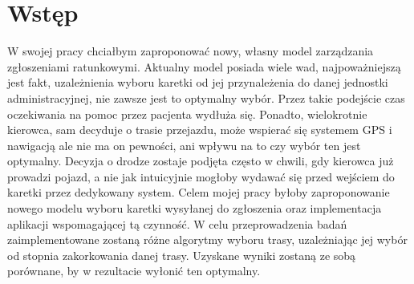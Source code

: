 \documentclass[12pt]{article} %
\begin{document}

\tableofcontents %

\newpage %


\section{Wstęp}
W swojej pracy chciałbym zaproponować nowy, własny model zarządzania zgłoszeniami ratunkowymi. Aktualny model posiada wiele wad, najpoważniejszą jest fakt, uzależnienia wyboru karetki od jej przynależenia do danej jednostki administracyjnej, nie zawsze jest to optymalny wybór. Przez takie podejście czas oczekiwania na pomoc przez pacjenta wydłuża się. Ponadto, wielokrotnie kierowca, sam decyduje o trasie przejazdu, może wspierać się systemem GPS i nawigacją ale nie ma on pewności, ani wpływu na to czy wybór ten jest optymalny. Decyzja o drodze zostaje podjęta często w chwili, gdy kierowca już prowadzi pojazd, a nie jak intuicyjnie mogłoby wydawać się przed wejściem do karetki przez dedykowany system.
Celem mojej pracy byłoby zaproponowanie nowego modelu wyboru karetki wysyłanej do zgłoszenia oraz implementacja aplikacji wspomagającej tą czynność. W celu przeprowadzenia badań zaimplementowane zostaną różne algorytmy wyboru trasy, uzależniając jej wybór od stopnia zakorkowania danej trasy. Uzyskane wyniki zostaną ze sobą porównane, by w rezultacie wyłonić ten optymalny.
\end{document}
